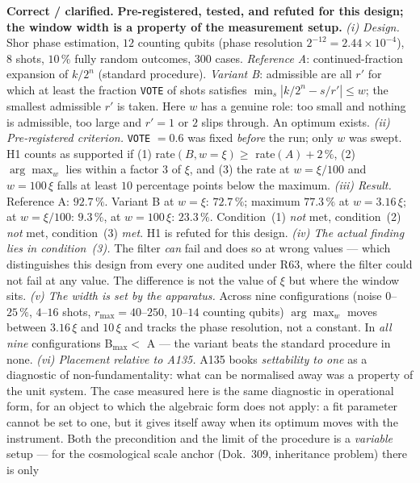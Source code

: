 \smallskip\noindent\textbf{Correct / clarified.}\quad
\textbf{Pre-registered, tested, and refuted for this design; the window
width is a property of the measurement setup.}
\emph{(i) Design.} Shor phase estimation, $12$ counting qubits (phase
resolution $2^{-12} = 2.44\times10^{-4}$), $8$ shots, $10\,\%$ fully
random outcomes, $300$ cases.
\emph{Reference A}: continued-fraction expansion of $k/2^{n}$ (standard
procedure). \emph{Variant B}: admissible are all $r'$ for which at least
the fraction \texttt{VOTE} of shots satisfies
$\min_s |k/2^n - s/r'| \le w$; the smallest admissible $r'$ is taken.
Here $w$ has a genuine role: too small and nothing is admissible, too
large and $r' = 1$ or $2$ slips through. An optimum exists.
\emph{(ii) Pre-registered criterion.} \texttt{VOTE} $= 0.6$ was fixed
\emph{before} the run; only $w$ was swept. H1 counts as supported if
(1) rate$(B, w=\xi) \ge$ rate$(A) + 2\,\%$, (2) $\arg\max_w$ lies within
a factor $3$ of $\xi$, and (3) the rate at $w = \xi/100$ and
$w = 100\,\xi$ falls at least $10$ percentage points below the maximum.
\emph{(iii) Result.} Reference A: $92.7\,\%$. Variant B at $w = \xi$:
$72.7\,\%$; maximum $77.3\,\%$ at $w = 3.16\,\xi$; at $w = \xi/100$:
$9.3\,\%$, at $w = 100\,\xi$: $23.3\,\%$. Condition~(1) \emph{not} met,
condition~(2) \emph{not} met, condition~(3) \emph{met}. H1 is refuted for
this design.
\emph{(iv) The actual finding lies in condition~(3).} The filter
\emph{can} fail and does so at wrong values --- which distinguishes this
design from every one audited under R63, where the filter could not fail
at any value. The difference is not the value of $\xi$ but where the
window sits.
\emph{(v) The width is set by the apparatus.} Across nine configurations
(noise $0$--$25\,\%$, $4$--$16$ shots, $r_{\max} = 40$--$250$, $10$--$14$
counting qubits) $\arg\max_w$ moves between $3.16\,\xi$ and $10\,\xi$ and
tracks the phase resolution, not a constant. In \emph{all nine}
configurations B$_{\max} <$ A --- the variant beats the standard
procedure in none.
\emph{(vi) Placement relative to A135.} A135 books \emph{settability to
one} as a diagnostic of non-fundamentality: what can be normalised away
was a property of the unit system. The case measured here is the same
diagnostic in operational form, for an object to which the algebraic form
does not apply: a fit parameter cannot be set to one, but it gives itself
away when its optimum moves with the instrument. Both the precondition
and the limit of the procedure is a \emph{variable} setup --- for the
cosmological scale anchor (Dok.~309, inheritance problem) there is only

